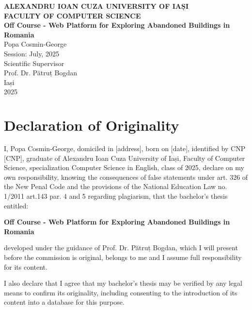 \documentclass[12pt,a4paper]{report}
\begin{document}
\begin{titlepage}
    \centering
    {\Large \textbf{ALEXANDRU IOAN CUZA UNIVERSITY OF IAȘI}}\\[0.5cm]
    {\Large \textbf{FACULTY OF COMPUTER SCIENCE}}\\[2cm]
    
    {\Huge \textbf{Off Course - Web Platform for Exploring Abandoned Buildings in Romania}}\\[3cm]
    
    {\Large Popa Cosmin-George}\\[2cm]
    
    {\large Session: July, 2025}\\[2cm]
    
    {\large Scientific Supervisor}\\
    {\large Prof. Dr. Pătruț Bogdan}\\[2cm]
    
    \vfill
    {\large Iași}\\
    {\large 2025}
\end{titlepage}

\chapter*{Declaration of Originality}

I, Popa Cosmin-George, domiciled in [address], born on [date], identified by CNP [CNP], graduate of Alexandru Ioan Cuza University of Iași, Faculty of Computer Science, specialization Computer Science in English, class of 2025, declare on my own responsibility, knowing the consequences of false statements under art. 326 of the New Penal Code and the provisions of the National Education Law no. 1/2011 art.143 par. 4 and 5 regarding plagiarism, that the bachelor's thesis entitled:

\textbf{Off Course - Web Platform for Exploring Abandoned Buildings in Romania}

developed under the guidance of Prof. Dr. Pătruț Bogdan, which I will present before the commission is original, belongs to me and I assume full responsibility for its content.

I also declare that I agree that my bachelor's thesis may be verified by any legal means to confirm its originality, including consenting to the introduction of its content into a database for this purpose.
\end{document}
